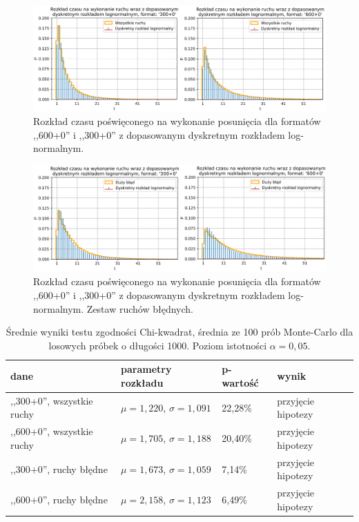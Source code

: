 \documentclass[inzynierska]{pwr_wmat_praca_dyplomowa}
\theoremstyle{plain}
\numberwithin{theorem}{chapter}
\theoremstyle{definition}
\numberwithin{theorem}{chapter}
\begin{document}
\begin{figure}[H]
	\centering
	\includegraphics[width=\textwidth]{discrete_lognorm_1.png}
	\caption{Rozkład czasu poświęconego na wykonanie posunięcia dla formatów ,,600+0'' i ,,300+0'' z dopasowanym dyskretnym rozkładem log-normalnym.}
	\label{rys:lognorm_disc}
\end{figure}
\begin{figure}[H]
	\centering
	\includegraphics[width=\textwidth]{discrete_lognorm_2.png}
	\caption{Rozkład czasu poświęconego na wykonanie posunięcia dla formatów ,,600+0'' i ,,300+0'' z dopasowanym dyskretnym rozkładem log-normalnym. Zestaw ruchów błędnych.}
	\label{rys:lognorm2_disc}
\end{figure}

\begin{table}[H]
	\caption{Średnie wyniki testu zgodności Chi-kwadrat, średnia ze 100 prób Monte-Carlo dla losowych próbek o długości 1000. Poziom istotności $\alpha = 0,05$.}
	\centering
	\begin{tabular}{|l|l|l|l|}
		\hline
		\textbf{dane}                     & \textbf{parametry rozkładu}& \textbf{p-wartość} & \textbf{wynik}     \\ \hline
		,,300+0'', wszystkie ruchy & $\mu = 1,220$, $\sigma = 1,091$& 22,28\%                    & przyjęcie hipotezy \\ \hline
		,,600+0'', wszystkie ruchy & $\mu = 1,705$, $\sigma = 1,188$& 20,40\%                    & przyjęcie hipotezy \\ \hline
		,,300+0'', ruchy błędne    & $\mu = 1,673$, $\sigma = 1,059$& 7,14\%                     & przyjęcie hipotezy \\ \hline
		,,600+0'', ruchy błędne    & $\mu = 2,158$, $\sigma = 1,123$& 6,49\%                     & przyjęcie hipotezy \\ \hline
	\end{tabular}
	\label{tab:testy} 
\end{table}
\end{document}
